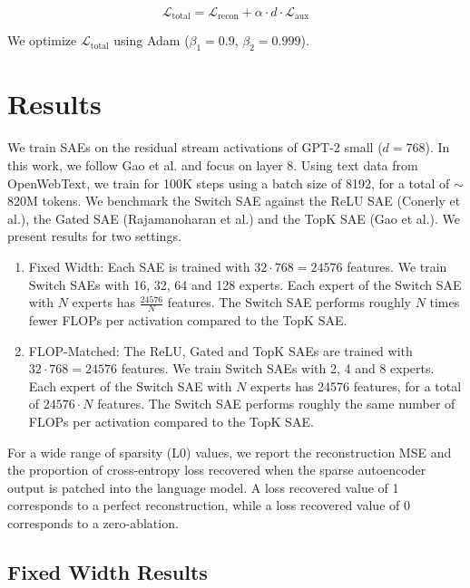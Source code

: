 \documentclass{article} %
\begin{document}
\begin{equation}
\mathcal{L}_{\text{total}} = \mathcal{L}_{\text{recon}} + \alpha \cdot d \cdot \mathcal{L}_{\text{aux}}
\end{equation}

We optimize $\mathcal{L}_{\text{total}}$ using Adam ($\beta_1 = 0.9$, $\beta_2 = 0.999$).

\section{Results}

We train SAEs on the residual stream activations of GPT-2 small ($d = 768$). In this work, we follow Gao et al. and focus on layer 8. Using text data from OpenWebText, we train for 100K steps using a batch size of 8192, for a total of $\sim$820M tokens. We benchmark the Switch SAE against the ReLU SAE (Conerly et al.), the Gated SAE (Rajamanoharan et al.) and the TopK SAE (Gao et al.). We present results for two settings.

\begin{enumerate}
    \item Fixed Width: Each SAE is trained with $32 \cdot 768 = 24576$ features. We train Switch SAEs with 16, 32, 64 and 128 experts. Each expert of the Switch SAE with $N$ experts has $\frac{24576}{N}$ features. The Switch SAE performs roughly $N$ times fewer FLOPs per activation compared to the TopK SAE.
    
    \item FLOP-Matched: The ReLU, Gated and TopK SAEs are trained with $32 \cdot 768 = 24576$ features. We train Switch SAEs with 2, 4 and 8 experts. Each expert of the Switch SAE with $N$ experts has 24576 features, for a total of $24576 \cdot N$ features. The Switch SAE performs roughly the same number of FLOPs per activation compared to the TopK SAE.
\end{enumerate}

For a wide range of sparsity (L0) values, we report the reconstruction MSE and the proportion of cross-entropy loss recovered when the sparse autoencoder output is patched into the language model. A loss recovered value of 1 corresponds to a perfect reconstruction, while a loss recovered value of 0 corresponds to a zero-ablation.

\subsection{Fixed Width Results}
\end{document}
